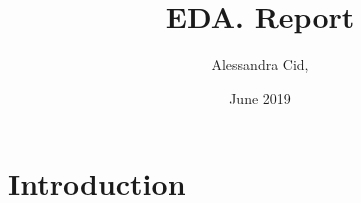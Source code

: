 \documentclass{article}
\title{EDA. Report}
\author{Alessandra Cid, }
\date{June 2019}
\begin{document}
\maketitle

\section{Introduction}
\end{document}
